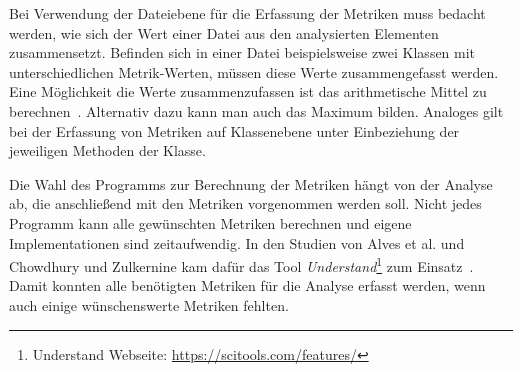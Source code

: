 Bei Verwendung der Dateiebene für die Erfassung der Metriken muss bedacht werden, wie sich der Wert einer Datei aus den analysierten Elementen zusammensetzt.
Befinden sich in einer Datei beispielsweise zwei Klassen mit unterschiedlichen Metrik-Werten, müssen diese Werte zusammengefasst werden.
Eine Möglichkeit die Werte zusammenzufassen ist das arithmetische Mittel zu berechnen~\cite{chowdhury_zulkernine_2009}.
Alternativ dazu kann man auch das Maximum bilden.
Analoges gilt bei der Erfassung von Metriken auf Klassenebene unter Einbeziehung der jeweiligen Methoden der Klasse.

Die Wahl des Programms zur Berechnung der Metriken hängt von der Analyse ab, die anschließend mit den Metriken vorgenommen werden soll.
Nicht jedes Programm kann alle gewünschten Metriken berechnen und eigene Implementationen sind zeitaufwendig.
In den Studien von Alves et al. und Chowdhury und Zulkernine kam dafür das Tool \emph{Understand}\footnote{Understand Webseite: \url{https://scitools.com/features/}} zum Einsatz~\cite{alves_et_al,chowdhury_zulkernine_2009}.
Damit konnten alle benötigten Metriken für die Analyse erfasst werden, wenn auch einige wünschenswerte Metriken fehlten.

